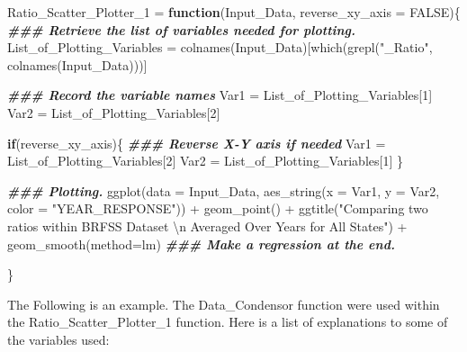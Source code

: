 \documentclass[
]{article}
\newenvironment{Shaded}{\begin{snugshade}}{\end{snugshade}}
\newcommand{\AttributeTok}[1]{\textcolor[rgb]{0.77,0.63,0.00}{#1}}
\newcommand{\ConstantTok}[1]{\textcolor[rgb]{0.00,0.00,0.00}{#1}}
\newcommand{\ControlFlowTok}[1]{\textcolor[rgb]{0.13,0.29,0.53}{\textbf{#1}}}
\newcommand{\DecValTok}[1]{\textcolor[rgb]{0.00,0.00,0.81}{#1}}
\newcommand{\DocumentationTok}[1]{\textcolor[rgb]{0.56,0.35,0.01}{\textbf{\textit{#1}}}}
\newcommand{\FunctionTok}[1]{\textcolor[rgb]{0.00,0.00,0.00}{#1}}
\newcommand{\NormalTok}[1]{#1}
\newcommand{\OtherTok}[1]{\textcolor[rgb]{0.56,0.35,0.01}{#1}}
\newcommand{\SpecialCharTok}[1]{\textcolor[rgb]{0.00,0.00,0.00}{#1}}
\newcommand{\StringTok}[1]{\textcolor[rgb]{0.31,0.60,0.02}{#1}}
\begin{document}
\begin{Shaded}
\begin{Highlighting}[]
\NormalTok{Ratio\_Scatter\_Plotter\_1 }\OtherTok{=} \ControlFlowTok{function}\NormalTok{(Input\_Data, }\AttributeTok{reverse\_xy\_axis =} \ConstantTok{FALSE}\NormalTok{)\{}
  \DocumentationTok{\#\#\# Retrieve the list of variables needed for plotting.}
\NormalTok{  List\_of\_Plotting\_Variables }\OtherTok{=} 
    \FunctionTok{colnames}\NormalTok{(Input\_Data)[}\FunctionTok{which}\NormalTok{(}\FunctionTok{grepl}\NormalTok{(}\StringTok{"\_Ratio"}\NormalTok{, }\FunctionTok{colnames}\NormalTok{(Input\_Data)))]}
  
  \DocumentationTok{\#\#\# Record the variable names}
\NormalTok{  Var1 }\OtherTok{=}\NormalTok{ List\_of\_Plotting\_Variables[}\DecValTok{1}\NormalTok{]}
\NormalTok{  Var2 }\OtherTok{=}\NormalTok{ List\_of\_Plotting\_Variables[}\DecValTok{2}\NormalTok{]}
  
  \ControlFlowTok{if}\NormalTok{(reverse\_xy\_axis)\{}
    \DocumentationTok{\#\#\# Reverse X{-}Y axis if needed}
\NormalTok{    Var1 }\OtherTok{=}\NormalTok{ List\_of\_Plotting\_Variables[}\DecValTok{2}\NormalTok{]}
\NormalTok{    Var2 }\OtherTok{=}\NormalTok{ List\_of\_Plotting\_Variables[}\DecValTok{1}\NormalTok{]}
\NormalTok{  \}}
  
  \DocumentationTok{\#\#\# Plotting.}
  \FunctionTok{ggplot}\NormalTok{(}\AttributeTok{data =}\NormalTok{ Input\_Data,}
                \FunctionTok{aes\_string}\NormalTok{(}\AttributeTok{x =}\NormalTok{ Var1, }
                           \AttributeTok{y =}\NormalTok{ Var2,}
                           \AttributeTok{color =} \StringTok{"YEAR\_RESPONSE"}\NormalTok{)) }\SpecialCharTok{+}
    \FunctionTok{geom\_point}\NormalTok{() }\SpecialCharTok{+}
    \FunctionTok{ggtitle}\NormalTok{(}\StringTok{"Comparing two ratios within BRFSS Dataset }
\StringTok{            }\SpecialCharTok{\textbackslash{}n}\StringTok{ Averaged Over Years for All States"}\NormalTok{) }\SpecialCharTok{+} 
    \FunctionTok{geom\_smooth}\NormalTok{(}\AttributeTok{method=}\StringTok{\textquotesingle{}lm\textquotesingle{}}\NormalTok{)}
  \DocumentationTok{\#\#\# Make a regression at the end.}
  
\NormalTok{\}}
\end{Highlighting}
\end{Shaded}

The Following is an example. The Data\_Condensor function were used
within the Ratio\_Scatter\_Plotter\_1 function. Here is a list of
explanations to some of the variables used:
\end{document}
